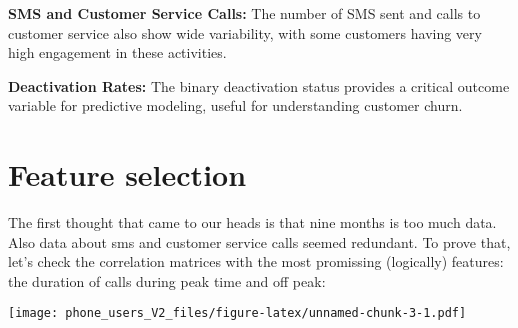 \documentclass[
]{article}
\newenvironment{Shaded}{\begin{snugshade}}{\end{snugshade}}
\newcommand{\AttributeTok}[1]{\textcolor[rgb]{0.13,0.29,0.53}{#1}}
\newcommand{\ConstantTok}[1]{\textcolor[rgb]{0.56,0.35,0.01}{#1}}
\newcommand{\FunctionTok}[1]{\textcolor[rgb]{0.13,0.29,0.53}{\textbf{#1}}}
\newcommand{\NormalTok}[1]{#1}
\newcommand{\OtherTok}[1]{\textcolor[rgb]{0.56,0.35,0.01}{#1}}
\newcommand{\SpecialCharTok}[1]{\textcolor[rgb]{0.81,0.36,0.00}{\textbf{#1}}}
\newcommand{\StringTok}[1]{\textcolor[rgb]{0.31,0.60,0.02}{#1}}
\begin{document}
\textbf{SMS and Customer Service Calls:} The number of SMS sent and
calls to customer service also show wide variability, with some
customers having very high engagement in these activities.

\textbf{Deactivation Rates:} The binary deactivation status provides a
critical outcome variable for predictive modeling, useful for
understanding customer churn.

\hypertarget{feature-selection}{%
\section{Feature selection}\label{feature-selection}}

The first thought that came to our heads is that nine months is too much
data. Also data about sms and customer service calls seemed redundant.
To prove that, let's check the correlation matrices with the most
promissing (logically) features: the duration of calls during peak time
and off peak:

\begin{Shaded}
\end{Shaded}

\texttt{[image: phone\_users\_V2\_files/figure-latex/unnamed-chunk-3-1.pdf]}
\end{document}
